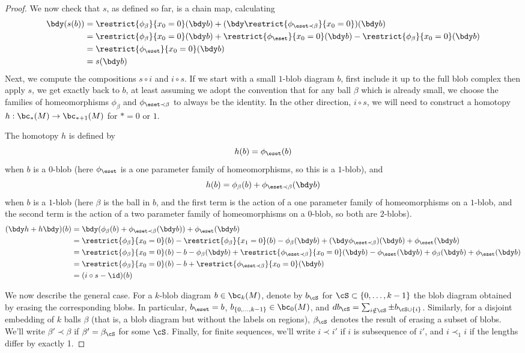 \begin{proof}
We now check that $s$, as defined so far, is a chain map, calculating
\begin{align*}
\bdy (s(b)) & = \restrict{\phi_\beta}{x_0=0}(\bdy b) + (\bdy \restrict{\phi_{\eset \prec \beta}}{x_0=0})(\bdy b) \\
		 & = \restrict{\phi_\beta}{x_0=0}(\bdy b) + \restrict{\phi_\eset}{x_0=0}(\bdy b) - \restrict{\phi_\beta}{x_0=0}(\bdy b) \\
		 & = \restrict{\phi_\eset}{x_0=0}(\bdy b) \\
		 & = s(\bdy b)
\end{align*}
Next, we compute the compositions $s \circ i$ and $i \circ s$. If we start with a small $1$-blob diagram $b$, first include it up to the full blob complex then apply $s$, we get exactly back to $b$, at least assuming we adopt the convention that for any ball $\beta$ which is already small, we choose the families of homeomorphisms $\phi_\beta$ and $\phi_{\eset \prec \beta}$ to always be the identity. In the other direction, $i \circ s$, we will need to construct a homotopy $h:\bc_*(M) \to \bc_{*+1}(M)$ for $*=0$ or $1$.

The homotopy $h$ is defined by $$h(b) = \phi_\eset(b)$$ when $b$ is a $0$-blob (here $\phi_\eset$ is a one parameter family of homeomorphisms, so this is a $1$-blob), and $$h(b) = \phi_\beta(b) + \phi_{\eset \prec \beta}(\bdy b)$$ when $b$ is a $1$-blob (here $\beta$ is the ball in $b$, and the first term is the action of a one parameter family of homeomorphisms on a $1$-blob, and the second term is the action of a two parameter family of homeomorphisms on a $0$-blob, so both are $2$-blobs).
\begin{align*}
(\bdy h+h \bdy)(b) & = \bdy (\phi_{\beta}(b) + \phi_{\eset \prec \beta}(\bdy b)) + \phi_\eset(\bdy b)  \\
	& =  \restrict{\phi_\beta}{x_0=0}(b) - \restrict{\phi_\beta}{x_1=0}(b) - \phi_\beta(\bdy b) + (\bdy \phi_{\eset \prec \beta})(\bdy b) + \phi_\eset(\bdy b) \\
	& =  \restrict{\phi_\beta}{x_0=0}(b) - b - \phi_\beta(\bdy b) + \restrict{\phi_{\eset \prec \beta}}{x_0=0}(\bdy b) -  \phi_\eset(\bdy b) + \phi_\beta(\bdy b) + \phi_\eset(\bdy b) \\
	& = \restrict{\phi_\beta}{x_0=0}(b) - b + \restrict{\phi_{\eset \prec \beta}}{x_0=0}(\bdy b) \\
	& = (i \circ s - \id)(b)
\end{align*}

We now describe the general case. For a $k$-blob diagram $b \in \bc_k(M)$, denote by $b_\cS$ for $\cS \subset \{0, \ldots, k-1\}$ the blob diagram obtained by erasing the corresponding blobs. In particular, $b_\eset = b$, $b_{\{0,\ldots,k-1\}} \in \bc_0(M)$, and $d b_\cS = \sum_{i \notin \cS} \pm  b_{\cS \cup \{i\}}$.
Similarly, for a disjoint embedding of $k$ balls $\beta$ (that is, a blob diagram but without the labels on regions), $\beta_\cS$ denotes the result of erasing a subset of blobs. We'll write $\beta' \prec \beta$ if $\beta' = \beta_\cS$ for some $\cS$. Finally, for finite sequences, we'll write $i \prec i'$ if $i$ is subsequence of $i'$, and $i \prec_1 i$ if the lengths differ by exactly 1.


\end{proof}
